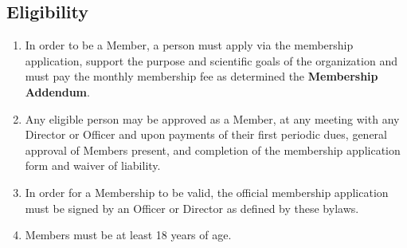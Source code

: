 \documentclass{article}
\begin{document}
\subsection{Eligibility}
\begin{enumerate}
    \item In order to be a Member, a person must apply via the membership
    application, support the purpose and scientific goals of the organization
    and must pay the monthly membership fee as determined the \textbf{Membership Addendum}.
    \item Any eligible person may be approved as a Member, at any meeting with
    any Director or Officer and upon payments of their first periodic dues,
    general approval of Members present, and completion of the membership
    application form and waiver of liability.
    \item In order for a Membership to be valid, the official membership
    application must be signed by an Officer or Director as defined by these
    bylaws.
    \item Members must be at least 18 years of age.
\end{enumerate}
\end{document}
